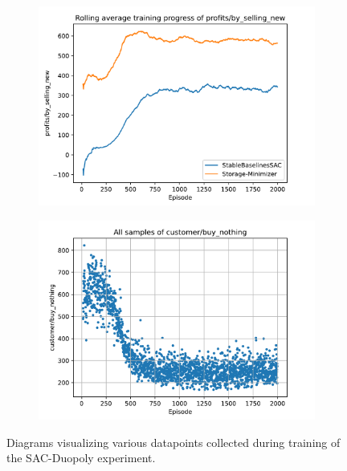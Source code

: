 \begin{figure}[!hbt]
	\begin{subfigure}{0.49\textwidth}
		\centering
		\includegraphics[width = \textwidth]{images/experiments/SACDuopoly/SACDuopolyMixedGraphs3.pdf}\\
		\label{fig:SACDuopolyMixedGraphs3}
	\end{subfigure}
	\begin{subfigure}{0.49\textwidth}
		\centering
		\includegraphics[width = \textwidth]{images/experiments/SACDuopoly/SACDuopolyMixedGraphs4.pdf}\\
		\label{fig:SACDuopolyMixedGraphs4}
	\end{subfigure}
	\caption{Diagrams visualizing various datapoints collected during training of the SAC-Duopoly experiment.}\label{fig:SACDuopolyMixedGraphs}
\end{figure}

